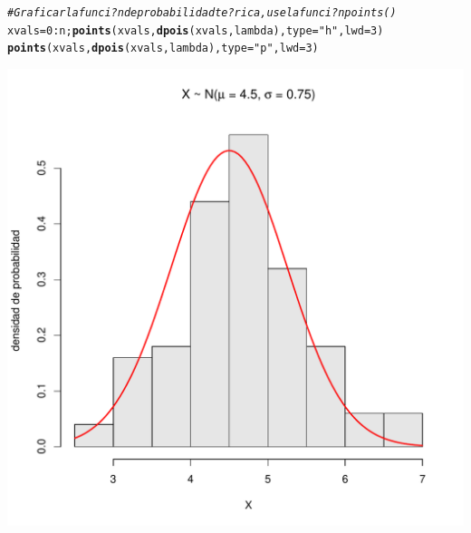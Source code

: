 \documentclass[10pt,a4paper]{article}\usepackage[]{graphicx}\usepackage[]{color}
\makeatletter
\def\maxwidth{ %
  \ifdim\Gin@nat@width>\linewidth
    \linewidth
  \else
    \Gin@nat@width
  \fi
}
\newcommand{\hlnum}[1]{\textcolor[rgb]{0.686,0.059,0.569}{#1}}%
\newcommand{\hlstr}[1]{\textcolor[rgb]{0.192,0.494,0.8}{#1}}%
\newcommand{\hlcom}[1]{\textcolor[rgb]{0.678,0.584,0.686}{\textit{#1}}}%
\newcommand{\hlopt}[1]{\textcolor[rgb]{0,0,0}{#1}}%
\newcommand{\hlstd}[1]{\textcolor[rgb]{0.345,0.345,0.345}{#1}}%
\newcommand{\hlkwb}[1]{\textcolor[rgb]{0.69,0.353,0.396}{#1}}%
\newcommand{\hlkwc}[1]{\textcolor[rgb]{0.333,0.667,0.333}{#1}}%
\newcommand{\hlkwd}[1]{\textcolor[rgb]{0.737,0.353,0.396}{\textbf{#1}}}%
\newenvironment{kframe}{%
 \def\at@end@of@kframe{}%
 \ifinner\ifhmode%
  \def\at@end@of@kframe{\end{minipage}}%
  \begin{minipage}{\columnwidth}%
 \fi\fi%
 \def\FrameCommand##1{\hskip\@totalleftmargin \hskip-\fboxsep
 \colorbox{shadecolor}{##1}\hskip-\fboxsep
     \hskip-\linewidth \hskip-\@totalleftmargin \hskip\columnwidth}%
 \MakeFramed {\advance\hsize-\width
   \@totalleftmargin\z@ \linewidth\hsize
   \@setminipage}}%
 {\par\unskip\endMakeFramed%
 \at@end@of@kframe}
\newenvironment{knitrout}{}{} %
\makeatother
\begin{document}
\begin{knitrout}
\begin{kframe}
\begin{alltt}
\hlcom{# Graficar la funci?n de probabilidadte?rica, use la funci?n points() }
\hlstd{xvals}\hlkwb{=}\hlnum{0}\hlopt{:}\hlstd{n;} \hlkwd{points}\hlstd{(xvals,} \hlkwd{dpois}\hlstd{(xvals, lambda),} \hlkwc{type}\hlstd{=}\hlstr{"h"}\hlstd{,} \hlkwc{lwd}\hlstd{=}\hlnum{3}\hlstd{)}
\hlkwd{points}\hlstd{(xvals,} \hlkwd{dpois}\hlstd{(xvals, lambda),} \hlkwc{type}\hlstd{=}\hlstr{"p"}\hlstd{,} \hlkwc{lwd}\hlstd{=}\hlnum{3}\hlstd{)}
\end{alltt}
\end{kframe}
\includegraphics[width=\maxwidth]{figure/unnamed-chunk-6-1} 

\end{knitrout}
\end{document}
